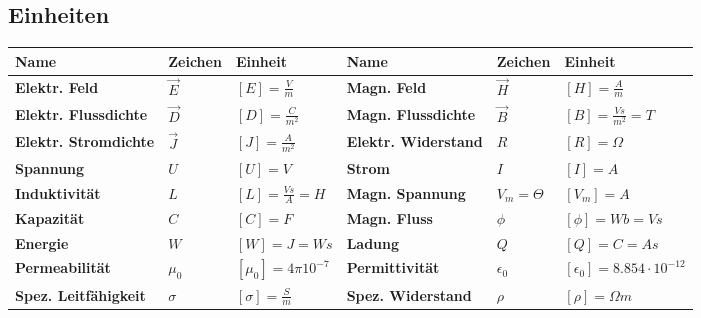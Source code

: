 \subsection{Einheiten}
\renewcommand{\arraystretch}{1.5}
\begin{tabular}{|p{3.5cm}|p{1.5cm}|p{3cm}||p{3.5cm}|p{1.5cm}|p{3.2cm}|}
	\hline
	\textbf{Name}			&\textbf{Zeichen} & \textbf{Einheit}&
	\textbf{Name}			&\textbf{Zeichen} & \textbf{Einheit}\\
	\hline
	\textbf{Elektr. Feld} 	& $\vec{E}$	& $[E] = \frac{V}{m}$&	
	\textbf{Magn. Feld}		& $\vec{H}$ & $[H] = \frac{A}{m}$\\
	\hline
	\textbf{Elektr. Flussdichte}&$\vec{D}$&$[D] = \frac{C}{m^2}$&
	\textbf{Magn. Flussdichte}&$\vec{B}$&$[B] = \frac{Vs}{m^2}=T$\\
	\hline
	\textbf{Elektr. Stromdichte} &$\vec{J}$& $[J]=\frac{A}{m^2}$&
	\textbf{Elektr. Widerstand} &$R$ &$[R]=\Omega$\\
	\hline
	\textbf{Spannung}&$U$&$[U]=V$&
	\textbf{Strom}&$I$&$[I]=A$\\
	\hline
	\textbf{Induktivität}&$L$&$[L]=\frac{Vs}{A}=H$&
	\textbf{Magn. Spannung}&$V_{m}=\Theta$&$[V_{m}]=A$\\
	\hline
	\textbf{Kapazität}&$C$&$[C]=F$&
	\textbf{Magn. Fluss}&$\phi$&$[\phi]=Wb=Vs$\\
	\hline
	\textbf{Energie}&$W$&$[W]=J=Ws$&
	\textbf{Ladung}&$Q$&$[Q]=C=As$\\
	\hline	
	\textbf{Permeabilität}&$\mu_{0} $&$[\mu_{0}]=4\pi 10^{-7}$&
	\textbf{Permittivität}&$\epsilon_{0}$&$[\epsilon_{0}]=8.854\cdot 10^{-12}$\\
	\hline
	\textbf{Spez. Leitfähigkeit}&$\sigma$&$[\sigma]=\frac{S}{m}$&
	\textbf{Spez. Widerstand}&$\rho $&$[\rho]=\Omega m $\\
	\hline
\end{tabular}

\clearpage
\pagebreak